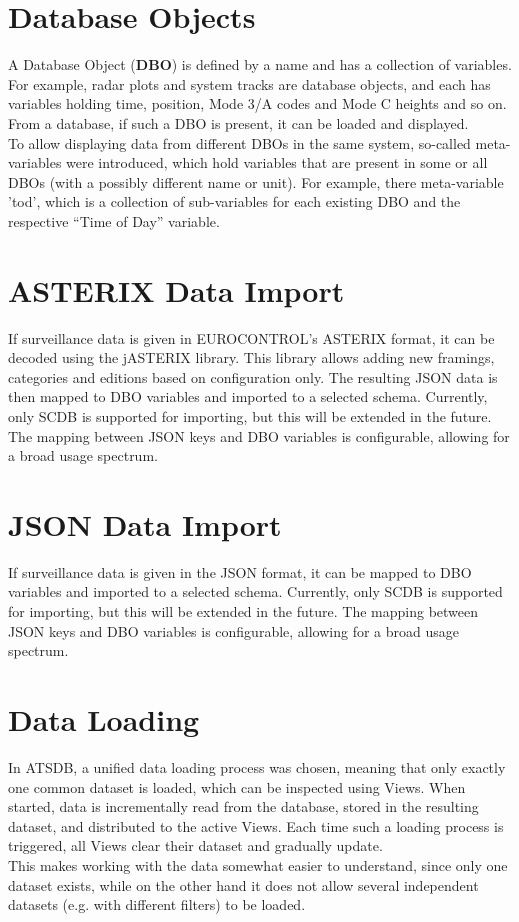 \section*{Database Objects}
A Database Object (\textbf{DBO}) is defined by a name and has a collection of variables. For example, radar plots and system tracks are database objects, and each has variables holding time, position, Mode 3/A codes and Mode C heights and so on. From a database, if such a DBO is present, it can be loaded and displayed.\\

To allow displaying data from different DBOs in the same system, so-called meta-variables were  introduced, which hold variables that are present in some or all DBOs (with a possibly different name or unit).  For example, there meta-variable 'tod', which is a collection of sub-variables for each existing DBO and the respective ``Time of Day'' variable.

\section*{ASTERIX Data Import}
If surveillance data is given in EUROCONTROL's ASTERIX format, it can be decoded using the jASTERIX library. This library allows adding new framings, categories and editions based on configuration only. The resulting JSON data is then mapped to DBO variables and imported to a selected schema. Currently, only SCDB is supported for importing, but this will be extended in the future. The mapping between JSON keys and DBO variables is configurable, allowing for a broad usage spectrum.

\section*{JSON Data Import}
If surveillance data is given in the JSON format, it can be mapped to DBO variables and imported to a selected schema. Currently, only SCDB is supported for importing, but this will be extended in the future. The mapping between JSON keys and DBO variables is configurable, allowing for a broad usage spectrum.

\section*{Data Loading}
In ATSDB, a unified data loading process was chosen, meaning that only exactly one common dataset is loaded, which can be inspected using Views. When started, data is incrementally read from the database, stored in the resulting dataset, and distributed to the active Views. Each time such a loading process is triggered, all Views clear their dataset and gradually update. \\
This makes working with the data somewhat easier to understand, since only one dataset exists, while on the other hand it does not allow several independent datasets (e.g. with different filters) to be loaded.

